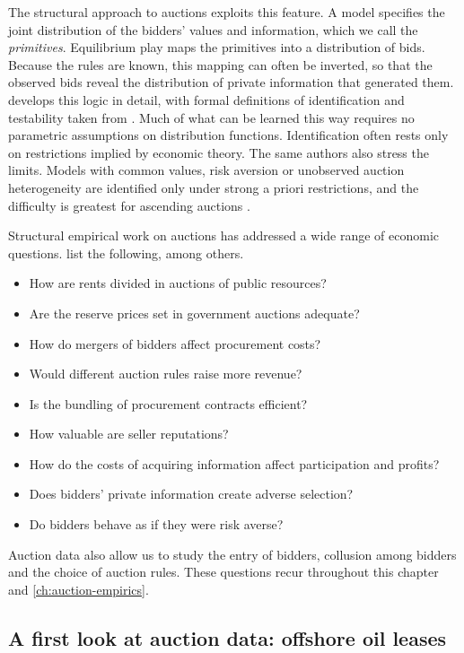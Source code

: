The structural approach to auctions exploits this feature. A model specifies the joint distribution of the
bidders' values and information, which we call the \emph{primitives}. Equilibrium play maps the primitives
into a distribution of bids. Because the rules are known, this mapping can often be inverted, so that the
observed bids reveal the distribution of private information that generated them. 
develops this logic in detail, with formal definitions of identification and testability taken from
\citet[Section~1]{AtheyHaile2007}. Much of what can be learned this way requires no parametric assumptions
on distribution functions. Identification often rests only on restrictions implied by economic theory. The
same authors also stress the limits. Models with common values, risk aversion or unobserved auction
heterogeneity are identified only under strong a priori restrictions, and the difficulty is greatest for
ascending auctions \citep[Section~1]{AtheyHaile2007}.

Structural empirical work on auctions has addressed a wide range of economic questions.
\citet[Section~1]{AtheyHaile2007} list the following, among others.
\begin{itemize}
  \item How are rents divided in auctions of public resources?
  \item Are the reserve prices set in government auctions adequate?
  \item How do mergers of bidders affect procurement costs?
  \item Would different auction rules raise more revenue?
  \item Is the bundling of procurement contracts efficient?
  \item How valuable are seller reputations?
  \item How do the costs of acquiring information affect participation and profits?
  \item Does bidders' private information create adverse selection?
  \item Do bidders behave as if they were risk averse?
\end{itemize}
Auction data also allow us to study the entry of bidders, collusion among bidders and the choice of auction
rules. These questions recur throughout this chapter and \cref{ch:auction-empirics}.

\subsection{A first look at auction data: offshore oil leases}\label{sec:14-why-hp}

